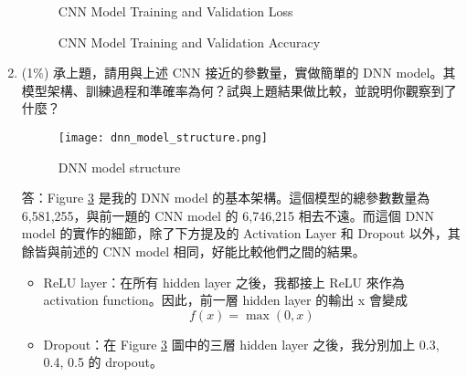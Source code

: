 \documentclass[12pt,a4paper]{extarticle}
\begin{document}
\begin{enumerate}
  \begin{figure}
    \centering
    \caption{CNN Model Training and Validation Loss}
    \label{fig:cnn-epoch-loss}
  \end{figure}

  \begin{figure}
    \centering
    \caption{CNN Model Training and Validation Accuracy}
    \label{fig:cnn-epoch-acc}
  \end{figure}

  \newpage

	\item (1\%) 承上題，請用與上述 CNN 接近的參數量，實做簡單的 DNN model。其模型架構、訓練過程和準確率為何？試與上題結果做比較，並說明你觀察到了什麼？

  \begin{figure}
    \centering
    \texttt{[image: dnn\_model\_structure.png]}
    \caption{DNN model structure}
    \label{fig:dnn-model-structure}
  \end{figure}

  \par 答：Figure \ref{fig:dnn-model-structure} 是我的 DNN model 的基本架構。這個模型的總參數數量為 6,581,255，與前一題的 CNN model 的 6,746,215 相去不遠。而這個 DNN model 的實作的細節，除了下方提及的 Activation Layer 和 Dropout 以外，其餘皆與前述的 CNN model 相同，好能比較他們之間的結果。
  \begin{itemize}
    \item ReLU layer：在所有 hidden layer 之後，我都接上 ReLU 來作為 activation function。因此，前一層 hidden layer 的輸出 x 會變成
    $$f(x) = \max(0, x)$$
    \item Dropout：在 Figure \ref{fig:dnn-model-structure} 圖中的三層 hidden layer 之後，我分別加上 0.3, 0.4, 0.5 的 dropout。
  \end{itemize}


\end{enumerate}
\end{document}

